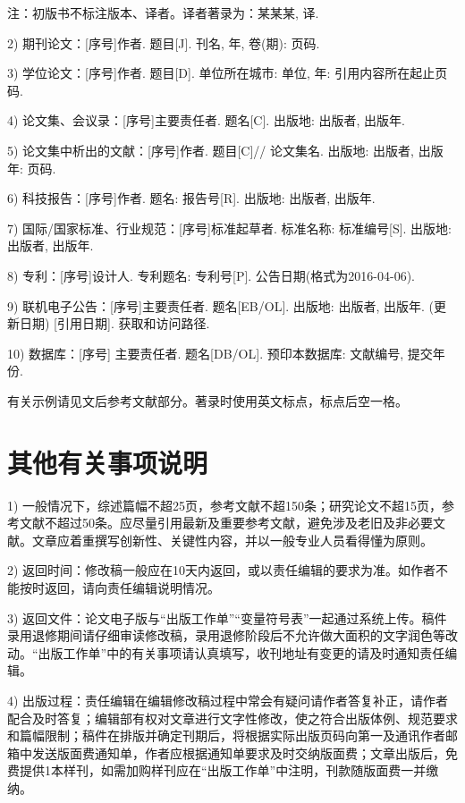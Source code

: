 \documentclass{aaas}
\newcommand\mycolorRed[1]{{\color{red}#1}}
\begin{document}
{\fontsize{9bp}{15.7bp}\selectfont 注：初版书不标注版本、译者。译者著录为：某某某, 译.\par}

2) 期刊论文：[序号]\quad 作者. 题目[J]. 刊名, 年, 卷(期): 页码.

3) 学位论文：[序号]\quad 作者. 题目[D]. 单位所在城市: 单位, 年\mycolorRed{: 引用内容所在起止页码}.

4) 论文集、会议录：[序号]\quad 主要责任者. 题名[C]. 出版地: 出版者, 出版年.

5) 论文集中析出的文献：[序号]\quad 作者. 题目[C]// 论文集名. 出版地: 出版者, 出版年: 页码.

6) 科技报告：[序号]\quad 作者. 题名: 报告号[R]. 出版地: 出版者, 出版年.

7) 国际/国家标准、行业规范：[序号]\quad 标准起草者. 标准名称: 标准编号[S]. 出版地: 出版者, 出版年.

8) 专利：[序号]\quad 设计人. 专利题名: 专利号[P]. 公告日期(格式为2016-04-06).

9) 联机电子公告：[序号]\quad 主要责任者. 题名[EB/OL]. 出版地: 出版者, 出版年. (更新日期) [引用日期]. 获取和访问路径.

10) 数据库：[序号] 主要责任者. 题名[DB/OL]. 预印本数据库: 文献编号, 提交年份.

有关示例请见文后参考文献部分。\mycolorRed{著录时使用英文标点，标点后空一格。}

\section{其他有关事项说明}
1) 一般情况下，综述篇幅不超25页，参考文献不超150条；研究论文不超15页，参考文献不超过50条。应尽量引用最新及重要参考文献，避免涉及老旧及非必要文献。文章应着重撰写创新性、关键性内容，并以一般专业人员看得懂为原则。

2) 返回时间：修改稿一般应在10天内返回，或以责任编辑的要求为准。如作者不能按时返回，请向责任编辑说明情况。

3) 返回文件：论文电子版与“出版工作单”“\mycolorRed{变量符号表}”一起通过系统上传。稿件录用退修期间请仔细审读修改稿，\mycolorRed{录用退修阶段后不允许做大面积的文字润色等改动。}“出版工作单”中的有关事项请认真填写，收刊地址有变更的请及时通知责任编辑。

4) 出版过程：责任编辑在编辑修改稿过程中常会有疑问请作者答复补正，请作者配合及时答复；编辑部有权对文章进行文字性修改，使之符合出版体例、规范要求和篇幅限制；稿件在排版并确定刊期后，将根据实际出版页码向第一及通讯作者邮箱中发送版面费通知单，作者应根据通知单要求及时交纳版面费；文章出版后，免费提供1本样刊，如需加购样刊应在“出版工作单”中注明，刊款随版面费一并缴纳。
\end{document}

